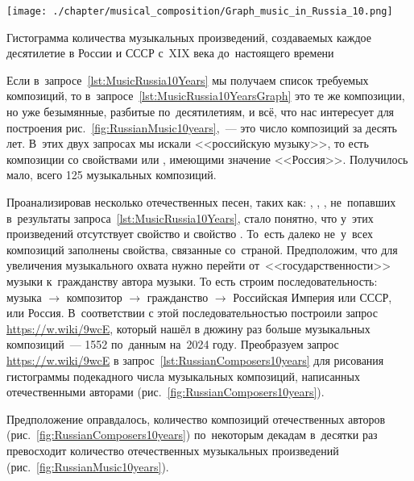 \begin{marginfigure}[0\baselineskip]
	\texttt{[image: ./chapter/musical\_composition/Graph\_music\_in\_Russia\_10.png]}
    \vspace{-10pt}
	\caption{Гистограмма количества музыкальных произведений, 
             создаваемых каждое десятилетие в России и СССР с~XIX века до~настоящего времени}%
	\label{fig:RussianMusic10years}%
\end{marginfigure}


Если в~запросе~\ref{lst:MusicRussia10Years} мы получаем список требуемых композиций, 
то   в~запросе~\ref{lst:MusicRussia10YearsGraph} это те же композиции, но уже безымянные, 
разбитые по~десятилетиям, и всё, что нас интересует для построения рис.~\ref{fig:RussianMusic10years},~--- 
это число композиций за десять лет. 
В~этих двух запросах мы искали <<российскую музыку>>, то есть композиции со свойствами 
 или 
, имеющими значение <<Россия>>. 
Получилось мало, всего 125 музыкальных композиций. 

Проанализировав несколько отечественных песен, таких как: 
, 
, 
, 
не~попавших в~результаты запроса~\ref{lst:MusicRussia10Years}, стало понятно, 
что у~этих произведений отсутствует свойство  и свойство . 
То~есть далеко не~у~всех композиций заполнены свойства, 
связанные со~страной. 
Предположим, что для увеличения музыкального охвата нужно перейти от~<<государственности>> музыки 
к~гражданству автора музыки. 
То есть строим последовательность: музыка $\rightarrow$ композитор $\rightarrow$ 
гражданство $\rightarrow$ Российская Империя или СССР, или Россия.
В~соответствии с этой последовательностью построили запрос \href{https://w.wiki/9wcE}
                                                                {https://w.wiki/9wcE}, 
который нашёл в дюжину раз больше музыкальных композиций~--- 1552 по~данным на~2024 году. 
Преобразуем запрос \href{https://w.wiki/9wcE}
                        {https://w.wiki/9wcE} в запрос~\ref{lst:RussianComposers10years} 
для рисования гистограммы подекадного числа музыкальных композиций, 
написанных отечественными авторами (рис.~\ref{fig:RussianComposers10years}). 

Предположение оправдалось, количество композиций отечественных авторов 
(рис.~\ref{fig:RussianComposers10years}) 
по~некоторым декадам в~десятки раз превосходит 
количество отечественных музыкальных произведений (рис.~\ref{fig:RussianMusic10years}).


